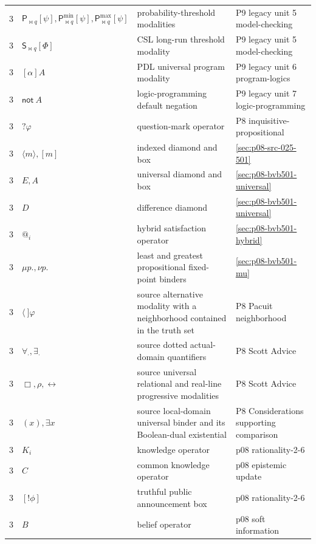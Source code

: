\begin{longtable}{@{}p{}p{}p{}p{}@{}}
3 & \(\mathsf P_{\bowtie q}[\psi],\mathsf P^{\min}_{\bowtie q}[\psi],\mathsf P^{\max}_{\bowtie q}[\psi]\) & probability-threshold modalities & P9 legacy unit 5 model-checking \\
3 & \(\mathsf S_{\bowtie q}[\Phi]\) & CSL long-run threshold modality & P9 legacy unit 5 model-checking \\
3 & \([\alpha]A\) & PDL universal program modality & P9 legacy unit 6 program-logics \\
3 & \(\mathsf{not}\ A\) & logic-programming default negation & P9 legacy unit 7 logic-programming \\
3 & \(?\varphi\) & question-mark operator & P8 inquisitive-propositional \\
3 & \(\langle m\rangle,[m]\) & indexed diamond and box & \hyperref[sec:p08-src-025-501]{\ref*{sec:p08-src-025-501}} \\
3 & \(E,A\) & universal diamond and box & \hyperref[sec:p08-bvb501-universal]{\ref*{sec:p08-bvb501-universal}} \\
3 & \(D\) & difference diamond & \hyperref[sec:p08-bvb501-universal]{\ref*{sec:p08-bvb501-universal}} \\
3 & \(@_i\) & hybrid satisfaction operator & \hyperref[sec:p08-bvb501-hybrid]{\ref*{sec:p08-bvb501-hybrid}} \\
3 & \(\mu p.,\nu p.\) & least and greatest propositional fixed-point binders & \hyperref[sec:p08-bvb501-mu]{\ref*{sec:p08-bvb501-mu}} \\
3 & \(\langle\ ]\varphi\) & source alternative modality with a neighborhood contained in the truth set & P8 Pacuit neighborhood \\
3 & \(\forall_{\cdot},\exists_{\cdot}\) & source dotted actual-domain quantifiers & P8 Scott Advice \\
3 & \(\Box,\boxed\rho,\boxed{\leftrightarrow}\) & source universal relational and real-line progressive modalities & P8 Scott Advice \\
3 & \((x),\exists x\) & source local-domain universal binder and its Boolean-dual existential & P8 Considerations supporting comparison \\
3 & \(K_i\) & knowledge operator & p08 rationality-2-6 \\
3 & \(C\) & common knowledge operator & p08 epistemic update \\
3 & \([!\phi]\) & truthful public announcement box & p08 rationality-2-6 \\
3 & \(B\) & belief operator & p08 soft information \\

\end{longtable}
